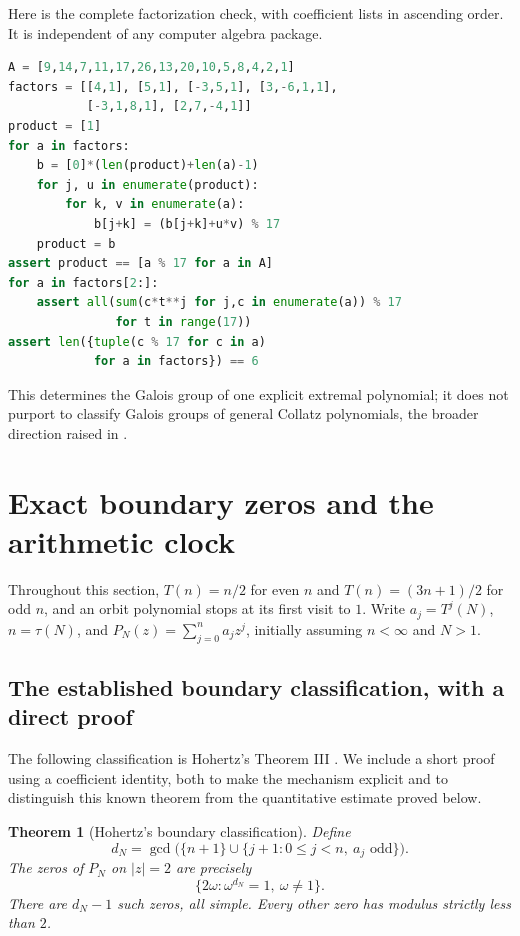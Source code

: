 \documentclass[11pt,a4paper]{article}
\newtheorem{theorem}{Theorem}[section]
\theoremstyle{definition}
\theoremstyle{remark}
\numberwithin{equation}{section}
\begin{document}
Here is the complete factorization check, with coefficient lists in
ascending order. It is independent of any computer algebra package.
\begin{lstlisting}[language=Python]
A = [9,14,7,11,17,26,13,20,10,5,8,4,2,1]
factors = [[4,1], [5,1], [-3,5,1], [3,-6,1,1],
           [-3,1,8,1], [2,7,-4,1]]
product = [1]
for a in factors:
    b = [0]*(len(product)+len(a)-1)
    for j, u in enumerate(product):
        for k, v in enumerate(a):
            b[j+k] = (b[j+k]+u*v) % 17
    product = b
assert product == [a % 17 for a in A]
for a in factors[2:]:
    assert all(sum(c*t**j for j,c in enumerate(a)) % 17
               for t in range(17))
assert len({tuple(c % 17 for c in a)
            for a in factors}) == 6
\end{lstlisting}
This determines the Galois group of one explicit extremal polynomial;
it does not purport to classify Galois groups of general Collatz
polynomials, the broader direction raised in
\cite[Section~5, question~6]{R005}.

\section{Exact boundary zeros and the arithmetic clock}
Throughout this section, $T(n)=n/2$ for even $n$ and
$T(n)=(3n+1)/2$ for odd $n$, and an orbit polynomial stops at its
first visit to $1$. Write $a_j=T^j(N)$, $n=\tau(N)$, and
$P_N(z)=\sum_{j=0}^n a_jz^j$, initially assuming $n<\infty$ and $N>1$.

\subsection{The established boundary classification, with a direct proof}
The following classification is Hohertz's Theorem III
\cite{R005}. We include a short proof using a coefficient identity,
both to make the mechanism explicit and to distinguish this known theorem
from the quantitative estimate proved below.

\begin{theorem}[Hohertz's boundary classification]\label{C:thm:boundary-known}
Define
\[
 d_N=\gcd\bigl(\{n+1\}\cup
     \{j+1:0\le j<n,\ a_j\text{ odd}\}\bigr).
\]
The zeros of $P_N$ on $|z|=2$ are precisely
\[
 \bigl\{2\omega:\omega^{d_N}=1,\ \omega\ne1\bigr\}.
\]
There are $d_N-1$ such zeros, all simple. Every other zero has modulus
strictly less than $2$.
\end{theorem}
\end{document}
